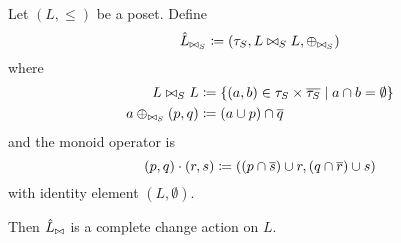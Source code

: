 \begin{prop}[name=Scott change actions, restate=hodatalog]
 Let $(L, \leq)$ be a poset. Define
  \begin{displaymath}
    \hat{L}_{{{\bowtie}_S}} 
    \coloneqq (\tau_S
    ,L \bowtie_S L,\oplus_{{\bowtie}_S})
  \end{displaymath}
  where
  \begin{align*}
    L \bowtie_S L &\coloneqq \{ (a, b) \in \tau_S \times \overline{\tau_S} \mid a \cap b = \emptyset \}\\
    a \oplus_{{\bowtie}_S} (p, q) &\coloneqq (a \cup p) \cap \overline q
  \end{align*}
  and the monoid operator is
  \begin{displaymath}
    (p, q) \cdot (r, s) \coloneqq ((p \cap \overline s) \cup r, (q \cap \overline r) \cup s)
  \end{displaymath}
  with identity element $(L, \emptyset)$.

  Then $\hat{L}_{\bowtie}$ is a complete change action on $L$.
\end{prop}


